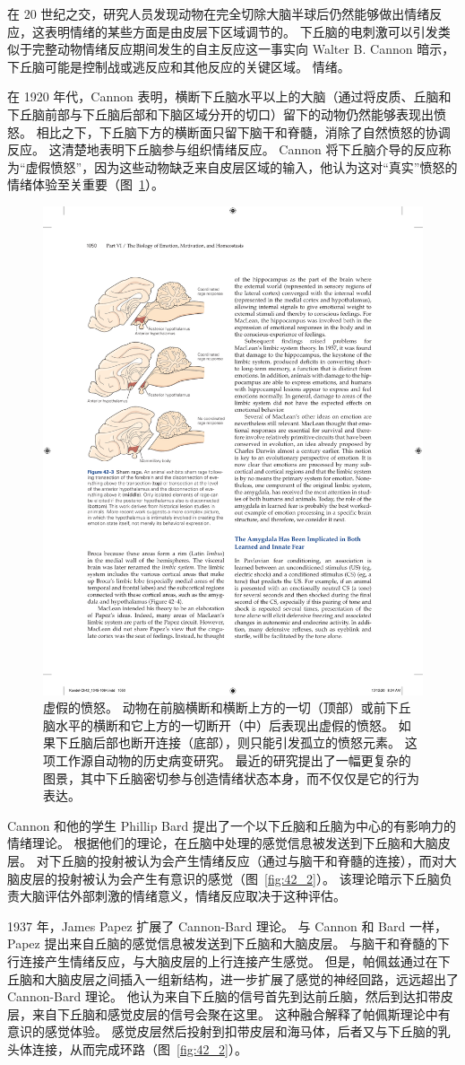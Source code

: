 在 20 世纪之交，研究人员发现动物在完全切除大脑半球后仍然能够做出情绪反应，这表明情绪的某些方面是由皮层下区域调节的。
下丘脑的电刺激可以引发类似于完整动物情绪反应期间发生的自主反应这一事实向 Walter B. Cannon 暗示，下丘脑可能是控制战或逃反应和其他反应的关键区域。 情绪。


在 1920 年代，Cannon 表明，横断下丘脑水平以上的大脑（通过将皮质、丘脑和下丘脑前部与下丘脑后部和下脑区域分开的切口）留下的动物仍然能够表现出愤怒。
相比之下，下丘脑下方的横断面只留下脑干和脊髓，消除了自然愤怒的协调反应。
这清楚地表明下丘脑参与组织情绪反应。
Cannon 将下丘脑介导的反应称为“虚假愤怒”，因为这些动物缺乏来自皮层区域的输入，他认为这对“真实”愤怒的情绪体验至关重要（图~\ref{fig:42_3}）。


\begin{figure}[htbp]
	\centering
	\includegraphics[width=0.5\linewidth]{chap42/fig_42_3}
	\caption{虚假的愤怒。
		动物在前脑横断和横断上方的一切（顶部）或前下丘脑水平的横断和它上方的一切断开（中）后表现出虚假的愤怒。
		如果下丘脑后部也断开连接（底部），则只能引发孤立的愤怒元素。
		这项工作源自动物的历史病变研究。
		最近的研究提出了一幅更复杂的图景，其中下丘脑密切参与创造情绪状态本身，而不仅仅是它的行为表达。}
	\label{fig:42_3}
\end{figure}


Cannon 和他的学生 Phillip Bard 提出了一个以下丘脑和丘脑为中心的有影响力的情绪理论。
根据他们的理论，在丘脑中处理的感觉信息被发送到下丘脑和大脑皮层。
对下丘脑的投射被认为会产生情绪反应（通过与脑干和脊髓的连接），而对大脑皮层的投射被认为会产生有意识的感觉（图~\ref{fig:42_2}）。
该理论暗示下丘脑负责大脑评估外部刺激的情绪意义，情绪反应取决于这种评估。


1937 年，James Papez 扩展了 Cannon-Bard 理论。
与 Cannon 和 Bard 一样，Papez 提出来自丘脑的感觉信息被发送到下丘脑和大脑皮层。
与脑干和脊髓的下行连接产生情绪反应，与大脑皮层的上行连接产生感觉。
但是，帕佩兹通过在下丘脑和大脑皮层之间插入一组新结构，进一步扩展了感觉的神经回路，远远超出了 Cannon-Bard 理论。
他认为来自下丘脑的信号首先到达前丘脑，然后到达扣带皮层，来自下丘脑和感觉皮层的信号会聚在这里。
这种融合解释了帕佩斯理论中有意识的感觉体验。
感觉皮层然后投射到扣带皮层和海马体，后者又与下丘脑的乳头体连接，从而完成环路（图~\ref{fig:42_2}）。


